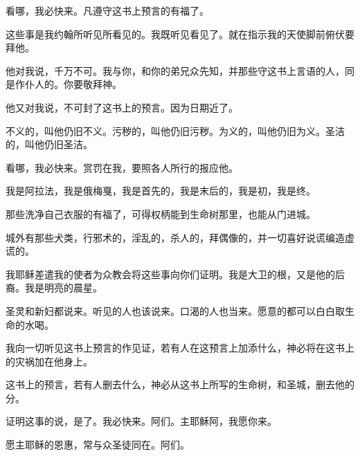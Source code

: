 \documentclass[12pt,oneside]{book}
\begin{document}
看哪，我必快来。凡遵守这书上预言的有福了。

这些事是我约翰所听见所看见的。我既听见看见了。就在指示我的天使脚前俯伏要拜他。

他对我说，千万不可。我与你，和你的弟兄众先知，并那些守这书上言语的人，同是作仆人的。你要敬拜神。

他又对我说，不可封了这书上的预言。因为日期近了。

不义的，叫他仍旧不义。污秽的，叫他仍旧污秽。为义的，叫他仍旧为义。圣洁的，叫他仍旧圣洁。

看哪，我必快来。赏罚在我，要照各人所行的报应他。

我是阿拉法，我是俄梅戛，我是首先的，我是末后的，我是初，我是终。

那些洗净自己衣服的有福了，可得权柄能到生命树那里，也能从门进城。

城外有那些犬类，行邪术的，淫乱的，杀人的，拜偶像的，并一切喜好说谎编造虚谎的。

我耶稣差遣我的使者为众教会将这些事向你们证明。我是大卫的根，又是他的后裔。我是明亮的晨星。

圣灵和新妇都说来。听见的人也该说来。口渴的人也当来。愿意的都可以白白取生命的水喝。

我向一切听见这书上预言的作见证，若有人在这预言上加添什么，神必将在这书上的灾祸加在他身上。

这书上的预言，若有人删去什么，神必从这书上所写的生命树，和圣城，删去他的分。

证明这事的说，是了。我必快来。阿们。主耶稣阿，我愿你来。

愿主耶稣的恩惠，常与众圣徒同在。阿们。

\backmatter
\end{document}
